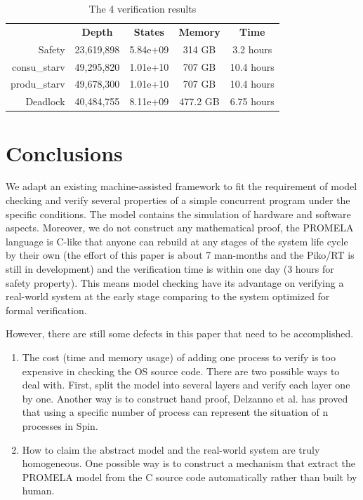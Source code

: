 \begin{table}
\caption{The 4 verification results}
\label{tab:verification}
\begin{tabular}{rcccc}
\toprule
 & \textbf{Depth} & \textbf{States} & \textbf{Memory} & \textbf{Time} \\
 \cmidrule{2-5}
Safety & 23,619,898 & 5.84e+09 & 314 GB & 3.2 hours \\
 \cmidrule{2-5}
consu\_starv & 49,295,820 & 1.01e+10 & 707 GB & 10.4 hours \\
 \cmidrule{2-5}
produ\_starv & 49,678,300 & 1.01e+10 & 707 GB & 10.4 hours \\
 \cmidrule{2-5}
Deadlock & 40,484,755 & 8.11e+09 & 477.2 GB & 6.75 hours \\
\bottomrule
\end{tabular}
\end{table}


\section{Conclusions}
We adapt an existing machine-assisted framework to fit the requirement of model checking and verify several properties of a simple concurrent program under the specific conditions. The model contains the simulation of hardware and software aspects. Moreover, we do not construct any mathematical proof, the PROMELA language is C-like that anyone can rebuild at any stages of the system life cycle by their own (the effort of this paper is about 7 man-months and the Piko/RT is still in development) and the verification time is within one day (3 hours for safety property). This means model checking have its advantage on verifying a real-world system at the early stage comparing to the system optimized for formal verification.

However, there are still some defects in this paper that need to be accomplished.

\begin{enumerate}
\item The cost (time and memory usage) of adding one process to verify is too expensive in checking the OS source code. There are two possible ways to deal with. First, split the model into several layers and verify each layer one by one. Another way is to construct hand proof, Delzanno et al. \cite{EPTCS161.13} has proved that using a specific number of process can represent the situation of n processes in Spin.
\item How to claim the abstract model and the real-world system are truly homogeneous. One possible way is to construct a mechanism that extract the PROMELA model from the C source code automatically rather than built by human.
\end{enumerate}
